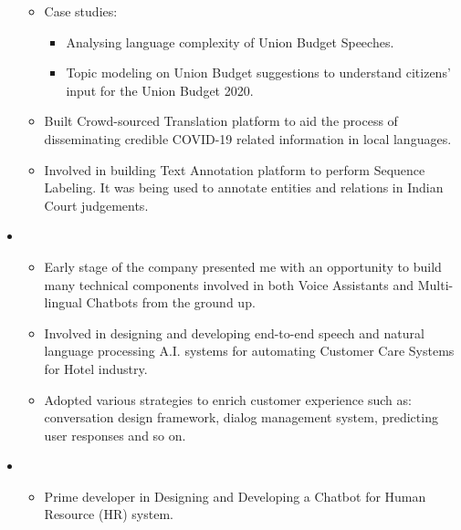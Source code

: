 \documentclass[11pt,a4paper,sans]{moderncv}
\begin{document}
\begin{itemize}
\begin{itemize}
    \item Case studies: 
    
    \begin{itemize}
        \item Analysing language complexity of Union Budget Speeches.
        \item Topic modeling on Union Budget suggestions to understand citizens’ input for the Union Budget 2020.
    \end{itemize}
    
    \item Built Crowd-sourced Translation platform to aid the process of disseminating credible COVID-19 related information in local languages.
    
    \item Involved in building Text Annotation platform to perform Sequence Labeling. It was being used to annotate entities and relations in Indian Court judgements.

\end{itemize}

\vspace{6pt}

\item{}
\begin{itemize}
    \item Early stage of the company presented me with an  opportunity to build many technical components involved in both Voice Assistants and Multi-lingual Chatbots from the ground up.
    \item Involved in designing and developing end-to-end speech and natural language processing A.I. systems for automating Customer Care Systems for Hotel industry.
    \item Adopted various strategies to enrich customer
    experience such as: conversation design framework, dialog management system, predicting user responses and so on.


\end{itemize}

\vspace{6pt}

\item{}

\begin{itemize}
    \item Prime developer in Designing and Developing a Chatbot for Human Resource (HR) system.


\end{itemize}
\end{itemize}
\end{document}

